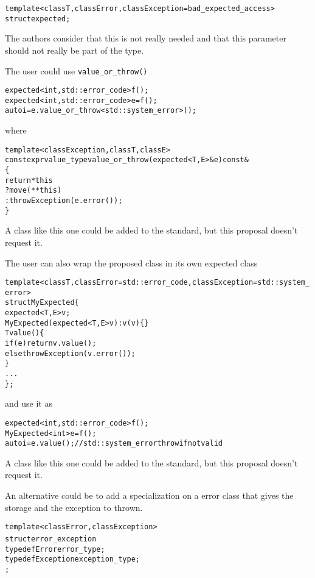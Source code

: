 \documentclass[a4paper,10pt]{article}
\newcommand{\cpp}[1]{\lstinline{#1}}
\begin{document}
\begin{alltt}
template <class T, class Error, class Exception = bad_expected_access>
  struct expected;
\end{alltt}

\noindent
The authors consider that this is not really needed and that this parameter should not really be part of the type.

The user could use \cpp{value_or_throw()} 

\begin{alltt}
expected<int, std::error_code> f();
expected<int, std::error_code> e = f();
auto i = e.value_or_throw<std::system_error>();  
\end{alltt}

\noindent
where 

\begin{alltt}
template <class Exception, class T, class E>
constexpr value_type value_or_throw(expected<T,E>& e) const&
\{
  return *this
    ? move(**this)
    : throw Exception(e.error());
\}
\end{alltt}

\noindent
A class like this one could be added to the standard, but this proposal doesn't request it. 

The user can also wrap the proposed class in its own expected class

\begin{alltt}
template <class T, class Error=std::error_code, class Exception=std::system_error>
struct MyExpected \{
  expected <T,E> v;
  MyExpected(expected <T,E> v) : v(v) \{\}
  T value() \{  
    if (e) return v.value();
    else throw Exception(v.error());
  \}
  ...
\};
\end{alltt}

\noindent
and use it as

\begin{alltt}
expected<int, std::error_code> f();
MyExpected<int> e = f();
auto i = e.value();  // std::system_error throw if not valid
\end{alltt}

\noindent
A class like this one could be added to the standard, but this proposal doesn't request it. 

An alternative could be to add a specialization on a error class that gives the storage and the exception to thrown.

\begin{alltt}
template <class Error, class Exception>
  struct error_exception {
    typedef Error error_type;
    typedef Exception exception_type;
  };
\end{alltt}
\end{document}
